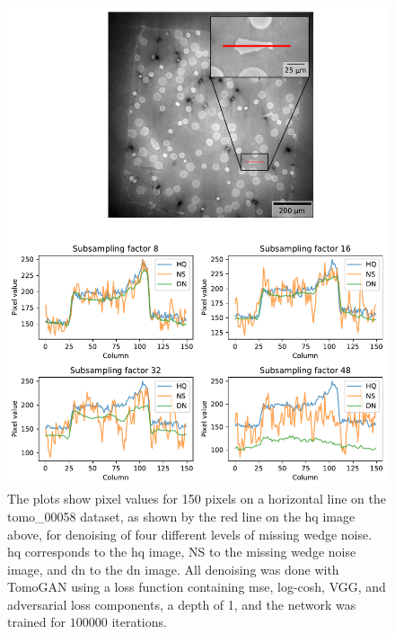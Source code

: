\begin{figure}[htbp]
  \centering
  \includegraphics[width=.95\textwidth]{figures/differentnoiselineplot1.pdf}
  \caption[Line plot of denoising of different levels of noise on tomo\_00058]{The plots show pixel values for 150 pixels on a horizontal line on the tomo\_00058 dataset, as shown by the red line on the \acrlong{hq} image above, for denoising of four different levels of missing wedge noise. \acrshort{hq} corresponds to the \acrlong{hq} image, NS to the missing wedge noise image, and \acrshort{dn} to the \acrfull{dn} image. All denoising was done with TomoGAN using a loss function containing \acrshort{mse}, log-cosh, VGG, and adversarial loss components, a depth of 1, and the network was trained for $100 000$ iterations. }
  \label{fig:differentnoiselineplot1}
\end{figure}

